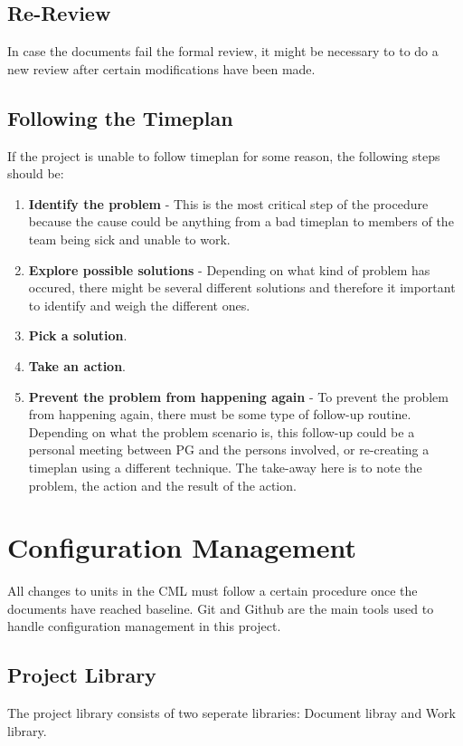 \documentclass{article}
\begin{document}
    \subsection{Re-Review}
        In case the documents fail the formal review, it might be necessary to
        to do a new review after certain modifications have been made.
            
    \subsection{Following the Timeplan}
        If the project is unable to follow timeplan for some reason, the following steps should be:
        \begin{enumerate}
            \item \textbf{Identify the problem} - This is the most critical step of the            procedure because the cause could be anything from a bad timeplan to
                    members of the team being sick and unable to work.
            \item \textbf{Explore possible solutions} - Depending on what kind of problem has occured, there might be several different solutions and therefore it important to identify and weigh the different ones.
            \item \textbf{Pick a solution}. 
            \item \textbf{Take an action}. 
            \item \textbf{Prevent the problem from happening again} - 
                    To prevent the problem from happening again, there must be some
                    type of follow-up routine. Depending on what the problem scenario is,
                    this follow-up could be a personal meeting between PG and the persons
                    involved, or re-creating a timeplan using a different technique.
                    The take-away here is to note the problem, the action and the result of the action. 
        \end{enumerate}

\section{Configuration Management}   %
    All changes to units in the CML must follow a certain procedure once the documents
    have reached baseline. Git and Github are the main tools used to handle configuration management in this project.

    \subsection{Project Library \label{project_library}}
        The project library consists of two seperate libraries: Document libray and Work library.
    
\end{document}
